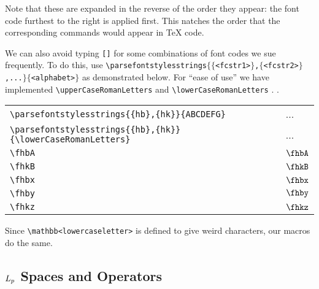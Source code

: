 \documentclass{article}
\begin{document}
Note that these are expanded in the reverse of the order they appear: the font code furthest to the right is applied first. This natches the order that the corresponding commands would appear in TeX code.

We can also avoid typing \texttt{[]} for some combinations of font codes we sue frequently.
To do this, use \texttt{\textbackslash parsefontstylesstrings$\{\{$<fcstr1>$\}$,$\{$<fcstr2>$\}$,...$\}\{$<alphabet>$\}$} as demonstrated below. For ``ease of use'' we have implemented \texttt{\textbackslash upperCaseRomanLetters} and \texttt{\textbackslash lowerCaseRomanLetters}
. 
. 

\begin{tabular}{ll}
	\verb!\parsefontstylesstrings{{hb},{hk}}{ABCDEFG}! & ...\\
	\verb!\parsefontstylesstrings{{hb},{hk}}{\lowerCaseRomanLetters}! & ...\\
    \verb!\fhbA! & $\fhbA$ \\
	\verb!\fhkB! & $\fhkB$ \\
	\verb!\fhbx! & $\fhbx$ \\
	\verb!\fhby! & $\fhby$ \\
	\verb!\fhkz! & $\fhkz$ \\
\end{tabular}

Since \texttt{\textbackslash mathbb{<lowercaseletter>}} is defined to give weird characters, our macros do the same.




\subsection{$L_{p}$ Spaces and Operators}
\end{document}
